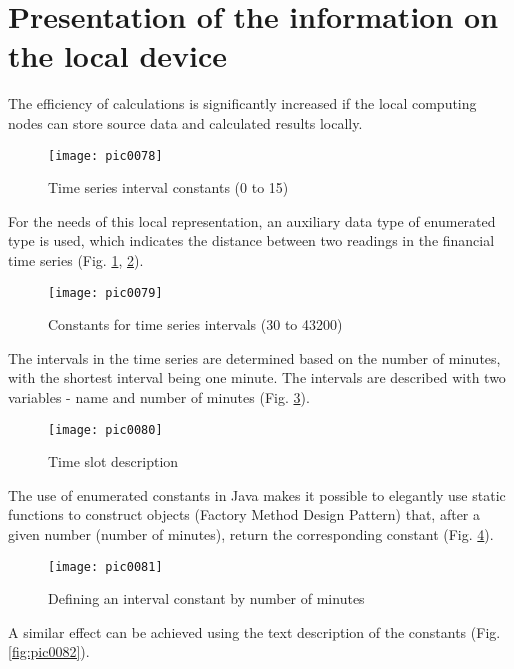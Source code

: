 \section{Presentation of the information on the local device}

The efficiency of calculations is significantly increased if the local computing nodes can store source data and calculated results locally.

\begin{figure}[h]
\centering
\texttt{[image: pic0078]}
\caption{Time series interval constants (0 to 15)}
\label{fig:pic0078}
\end{figure}
\FloatBarrier

For the needs of this local representation, an auxiliary data type of enumerated type is used, which indicates the distance between two readings in the financial time series (Fig. \ref{fig:pic0078}, \ref{fig:pic0079}).

\begin{figure}[h]
\centering
\texttt{[image: pic0079]}
\caption{Constants for time series intervals (30 to 43200)}
\label{fig:pic0079}
\end{figure}
\FloatBarrier

The intervals in the time series are determined based on the number of minutes, with the shortest interval being one minute. The intervals are described with two variables - name and number of minutes (Fig. \ref{fig:pic0080}).

\begin{figure}[h]
\centering
\texttt{[image: pic0080]}
\caption{Time slot description}
\label{fig:pic0080}
\end{figure}
\FloatBarrier

The use of enumerated constants in Java makes it possible to elegantly use static functions to construct objects (Factory Method Design Pattern) that, after a given number (number of minutes), return the corresponding constant (Fig. \ref{fig:pic0081}).

\begin{figure}[h]
\centering
\texttt{[image: pic0081]}
\caption{Defining an interval constant by number of minutes}
\label{fig:pic0081}
\end{figure}
\FloatBarrier

A similar effect can be achieved using the text description of the constants (Fig. \ref{fig:pic0082}).

